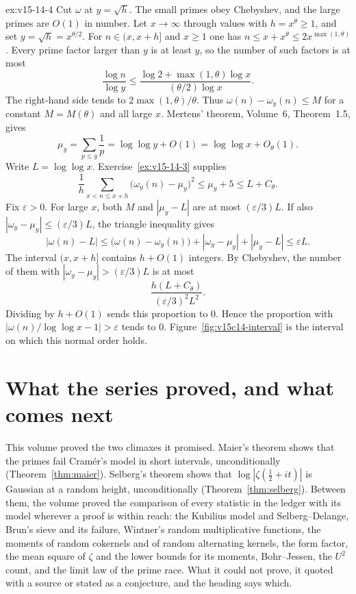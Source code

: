 \begin{solution}{ex:v15-14-4}
\idea Cut \(\omega\) at \(y=\sqrt h\). The small primes obey Chebyshev, and the large primes are \(O(1)\) in number.
\writeup Let \(x\to\infty\) through values with \(h=x^{\theta}\ge1\), and set \(y=\sqrt h=x^{\theta/2}\). For \(n\in(x,x+h]\) and \(x\ge1\) one has \(n\le x+x^{\theta}\le2x^{\max(1,\theta)}\). Every prime factor larger than \(y\) is at least \(y\), so the number of such factors is at most
\[
\frac{\log n}{\log y}\le\frac{\log2+\max(1,\theta)\log x}{(\theta/2)\log x}.
\]
The right-hand side tends to \(2\max(1,\theta)/\theta\). Thus \(\omega(n)-\omega_y(n)\le M\) for a constant \(M=M(\theta)\) and all large \(x\). Mertens' theorem, Volume~6, Theorem~1.5, gives
\[
\mu_y=\sum_{p\le y}\frac1p=\log\log y+O(1)=\log\log x+O_{\theta}(1).
\]
Write \(L=\log\log x\). Exercise~\ref{ex:v15-14-3} supplies
\[
\frac1h\sum_{x<n\le x+h}\bigl(\omega_y(n)-\mu_y\bigr)^2\le\mu_y+5\le L+C_{\theta}.
\]
Fix \(\varepsilon>0\). For large \(x\), both \(M\) and \(|\mu_y-L|\) are at most \((\varepsilon/3)L\). If also \(|\omega_y-\mu_y|\le(\varepsilon/3)L\), the triangle inequality gives
\[
|\omega(n)-L|\le\bigl(\omega(n)-\omega_y(n)\bigr)+|\omega_y-\mu_y|+|\mu_y-L|\le\varepsilon L.
\] The interval \((x,x+h]\) contains \(h+O(1)\) integers. By Chebyshev, the number of them with \(|\omega_y-\mu_y|>(\varepsilon/3)L\) is at most
\[
\frac{h(L+C_{\theta})}{(\varepsilon/3)^2 L^2}.
\]
Dividing by \(h+O(1)\) sends this proportion to \(0\). Hence the proportion with \(|\omega(n)/\log\log x-1|>\varepsilon\) tends to \(0\). Figure~\ref{fig:v15c14-interval} is the interval on which this normal order holds.
\end{solution}

\section{What the series proved, and what comes next}

This volume proved the two climaxes it promised. Maier's theorem shows that the primes fail Cram\'er's model in short intervals, unconditionally (Theorem~\ref{thm:maier}). Selberg's theorem shows that $\log|\zeta(\frac12+it)|$ is Gaussian at a random height, unconditionally (Theorem~\ref{thm:selberg}). Between them, the volume proved the comparison of every statistic in the ledger with its model wherever a proof is within reach: the Kubilius model and Selberg--Delange, Brun's sieve and its failure, Wintner's random multiplicative functions, the moments of random cokernels and of random alternating kernels, the form factor, the mean square of $\zeta$ and the lower bounds for its moments, Bohr--Jessen, the $U^2$ count, and the limit law of the prime race. What it could not prove, it quoted with a source or stated as a conjecture, and the heading says which.

